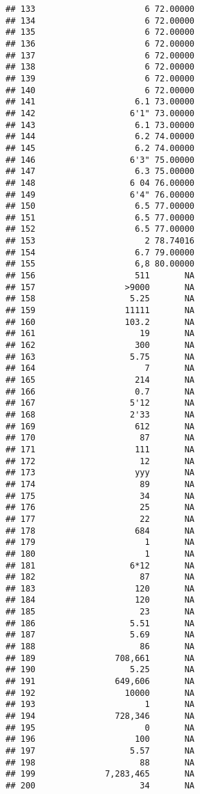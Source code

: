 \documentclass[
]{article}
\begin{document}
\begin{verbatim}
## 133                      6 72.00000
## 134                      6 72.00000
## 135                      6 72.00000
## 136                      6 72.00000
## 137                      6 72.00000
## 138                      6 72.00000
## 139                      6 72.00000
## 140                      6 72.00000
## 141                    6.1 73.00000
## 142                   6'1" 73.00000
## 143                    6.1 73.00000
## 144                    6.2 74.00000
## 145                    6.2 74.00000
## 146                   6'3" 75.00000
## 147                    6.3 75.00000
## 148                   6 04 76.00000
## 149                   6'4" 76.00000
## 150                    6.5 77.00000
## 151                    6.5 77.00000
## 152                    6.5 77.00000
## 153                      2 78.74016
## 154                    6.7 79.00000
## 155                    6,8 80.00000
## 156                    511       NA
## 157                  >9000       NA
## 158                   5.25       NA
## 159                  11111       NA
## 160                  103.2       NA
## 161                     19       NA
## 162                    300       NA
## 163                   5.75       NA
## 164                      7       NA
## 165                    214       NA
## 166                    0.7       NA
## 167                   5'12       NA
## 168                   2'33       NA
## 169                    612       NA
## 170                     87       NA
## 171                    111       NA
## 172                     12       NA
## 173                    yyy       NA
## 174                     89       NA
## 175                     34       NA
## 176                     25       NA
## 177                     22       NA
## 178                    684       NA
## 179                      1       NA
## 180                      1       NA
## 181                   6*12       NA
## 182                     87       NA
## 183                    120       NA
## 184                    120       NA
## 185                     23       NA
## 186                   5.51       NA
## 187                   5.69       NA
## 188                     86       NA
## 189                708,661       NA
## 190                   5.25       NA
## 191                649,606       NA
## 192                  10000       NA
## 193                      1       NA
## 194                728,346       NA
## 195                      0       NA
## 196                    100       NA
## 197                   5.57       NA
## 198                     88       NA
## 199              7,283,465       NA
## 200                     34       NA
\end{verbatim}
\end{document}
